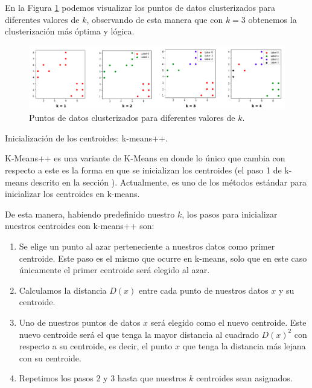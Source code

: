 \documentclass[12pt,a4paper]{article}
\makeatletter
\renewcommand\paragraph{\@startsection{paragraph}{4}{\z@}
            {-2.5ex\@plus -1ex \@minus -.25ex}
            {1.25ex \@plus .25ex}
            {\normalfont\normalsize\bfseries}}
\makeatother
\begin{document}
\begin{sloppypar}
\cleardoublepage
En la Figura \ref{fig:Elbow_3} podemos visualizar los puntos de datos clusterizados para diferentes valores de $k$, observando de esta manera que con $k=3$ obtenemos la clusterización más óptima y lógica.

\begin{figure}[H]    %
 \centering
 \includegraphics[width=1\textwidth]{images/Elbow_3.png}
 \captionsetup{justification=centering,margin=1cm}
 \caption{Puntos de datos clusterizados para diferentes valores de $k$.}
 \label{fig:Elbow_3}
\end{figure} 

\paragraph{Inicialización de los centroides: k-means++.}\label{k_means_plus_plus}

K-Means++\cite{K_means_plus_plus} es una variante de K-Means en donde lo único que cambia con respecto a este es la forma en que se inicializan los centroides (el paso 1 de k-means descrito en la sección \textit{}). Actualmente, es uno de los métodos estándar para inicializar los centroides en k-means.

De esta manera, habiendo predefinido nuestro $k$, los pasos para inicializar nuestros centroides con k-means++ son:

\begin{enumerate}
\item Se elige un punto al azar perteneciente a nuestros datos como primer centroide. Este paso es el mismo que ocurre en k-means, solo que en este caso únicamente el primer centroide será elegido al azar.
\item Calculamos la distancia $D(x)$ entre cada punto de nuestros datos $x$ y su centroide. 
\item Uno de nuestros puntos de datos $x$ será elegido como el nuevo centroide. Este nuevo centroide será el que tenga la mayor distancia al cuadrado $D(x)^2$ con respecto a su centroide, es decir, el punto $x$ que tenga la distancia más lejana con su centroide. 
\item Repetimos los pasos 2 y 3 hasta que nuestros $k$ centroides sean asignados.
\end{enumerate}


\end{sloppypar}
\end{document}
